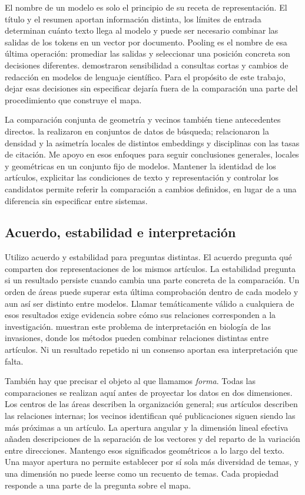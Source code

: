 \documentclass[12pt]{article}
\begin{document}
El nombre de un modelo es solo el principio de su receta de representación. El título y el resumen aportan información distinta, los límites de entrada determinan cuánto texto llega al modelo y puede ser necesario combinar las salidas de los tokens en un vector por documento. Pooling es el nombre de esa última operación: promediar las salidas y seleccionar una posición concreta son decisiones diferentes. \citet{singh-singh-2022-inefficiency} demostraron sensibilidad a consultas cortas y cambios de redacción en modelos de lenguaje científico. Para el propósito de este trabajo, dejar esas decisiones sin especificar dejaría fuera de la comparación una parte del procedimiento que construye el mapa.

La comparación conjunta de geometría y vecinos también tiene antecedentes directos. \citet{ref4e1e0d5582} la realizaron en conjuntos de datos de búsqueda; \citet{ref6da178065c} relacionaron la densidad y la asimetría locales de distintos embeddings y disciplinas con las tasas de citación. Me apoyo en esos enfoques para seguir conclusiones generales, locales y geométricas en un conjunto fijo de modelos. Mantener la identidad de los artículos, explicitar las condiciones de texto y representación y controlar los candidatos permite referir la comparación a cambios definidos, en lugar de a una diferencia sin especificar entre sistemas.

\subsection{Acuerdo, estabilidad e interpretación}
Utilizo acuerdo y estabilidad para preguntas distintas. El acuerdo pregunta qué comparten dos representaciones de los mismos artículos. La estabilidad pregunta si un resultado persiste cuando cambia una parte concreta de la comparación. Un orden de áreas puede superar esta última comprobación dentro de cada modelo y aun así ser distinto entre modelos. Llamar temáticamente válido a cualquiera de esos resultados exige evidencia sobre cómo sus relaciones corresponden a la investigación. \citet{QSSreviewQ17} muestran este problema de interpretación en biología de las invasiones, donde los métodos pueden combinar relaciones distintas entre artículos. Ni un resultado repetido ni un consenso aportan esa interpretación que falta.

También hay que precisar el objeto al que llamamos \emph{forma}. Todas las comparaciones se realizan aquí antes de proyectar los datos en dos dimensiones. Los centros de las áreas describen la organización general; sus artículos describen las relaciones internas; los vecinos identifican qué publicaciones siguen siendo las más próximas a un artículo. La apertura angular y la dimensión lineal efectiva añaden descripciones de la separación de los vectores y del reparto de la variación entre direcciones. Mantengo esos significados geométricos a lo largo del texto. Una mayor apertura no permite establecer por sí sola más diversidad de temas, y una dimensión no puede leerse como un recuento de temas. Cada propiedad responde a una parte de la pregunta sobre el mapa.
\end{document}
